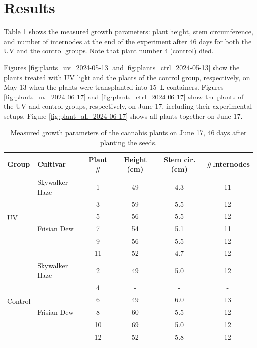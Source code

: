 \section{Results}

Table \ref{tab:measured_growth_parameters} shows the measured growth parameters: plant height, stem circumference, and number of internodes at the end of the experiment after \num[mode=text]{46} days for both the UV and the control groups. Note that plant number \num[mode=text]{4} (control) died.

Figures \ref{fig:plants_uv_2024-05-13} and \ref{fig:plants_ctrl_2024-05-13} show the plants treated with UV light and the plants of the control group, respectively, on May 13 when the plants were transplanted into \qty[mode=text]{15}{\L} containers. Figures \ref{fig:plants_uv_2024-06-17} and \ref{fig:plants_ctrl_2024-06-17} show the plants of the UV and control groups, respectively, on June 17, including their experimental setups. Figure \ref{fig:plant_all_2024-06-17} shows all plants together on June 17.

\begin{table}[htbp]
    \caption[Measured growth parameters of the cannabis plants]{Measured growth parameters of the cannabis plants on June 17, \num[mode=text]{46} days after planting the seeds.}
    \label{tab:measured_growth_parameters}
    \begin{tabularx}{\linewidth}{llcccc}
        \toprule
        \textbf{Group} & \textbf{Cultivar} & \textbf{Plant \#} & \textbf{Height (\unit[mode=text]{\cm})} & \textbf{Stem cir. (\unit[mode=text]{\cm})} & \textbf{\#{}Internodes} \\
        \midrule
        \multirow{6}{*}{UV} & Skywalker Haze & 1 & 49 & 4.3 & 11 \\
        & \multirow[t]{5}{*}{Frisian Dew} & 3 & 59 & 5.5 & 12 \\
        & & 5 & 56 & 5.5 & 12 \\
        & & 7 & 54 & 5.1 & 11 \\
        & & 9 & 56 & 5.5 & 12 \\
        & & 11 & 52 & 4.7 & 12 \\
        \midrule
        \multirow{6}{*}{Control} & Skywalker Haze & 2 & 49 & 5.0 & 12 \\
        & \multirow[t]{5}{*}{Frisian Dew} & 4 & - & - & - \\
        & & 6 & 49 & 6.0 & 13 \\
        & & 8 & 60 & 5.5 & 12 \\
        & & 10 & 69 & 5.0 & 12 \\
        & & 12 & 52 & 5.8 & 12 \\
        \bottomrule
    \end{tabularx}
\end{table}

